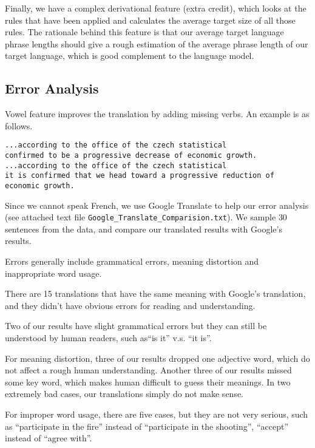 \documentclass[letterpaper]{article}
\begin{document}
\vspace{0.1cm}
Finally, we have a complex derivational feature (extra credit), which looks at the rules that have been applied and calculates the average target size of all those rules. The rationale behind this feature is that our average target language phrase lengths should give a rough estimation of the average phrase length of our target language, which is good complement to the language model.

\subsection{Error Analysis}
Vowel feature improves the translation by adding missing verbs. An example is as follows.
\begin{verbatim}
...according to the office of the czech statistical 
confirmed to be a progressive decrease of economic growth.
...according to the office of the czech statistical
it is confirmed that we head toward a progressive reduction of economic growth.
\end{verbatim}

Since we cannot speak French, we use Google Translate to help our error analysis (see attached text file \texttt{Google\_Translate\_Comparision.txt}). We sample $30$ sentences from the data, and compare
our translated results with Google's results.

Errors generally include grammatical errors, meaning distortion and inappropriate word usage.

There are 15 translations that have the same meaning with Google's translation, and they didn't have obvious errors for reading and understanding.

Two of our results have slight grammatical errors but they can still be understood by human readers, such as``is it'' v.s. ``it is''.

For meaning distortion, three of our results dropped one adjective word, which do not affect a rough human understanding. Another three of our results missed some key word, which makes human difficult to guess their meanings. In two extremely bad cases, our translations simply do not make sense.

For improper word usage, there are five cases, but they are not very serious, such as ``participate in the fire'' instead of ``participate in the shooting'', ``accept'' instead of ``agree with''.




\end{document}
